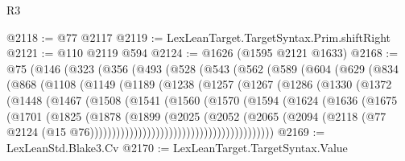 \begin{lexlean}{R3}
\begin{coremodule}
@2118 := @77 @2117
@2119 := LexLeanTarget.TargetSyntax.Prim.shiftRight
@2121 := @110 @2119 @594
@2124 := @1626 (@1595 @2121 @1633)
@2168 := @75
    (@146
      (@323
        (@356
          (@493
            (@528
              (@543
                (@562
                  (@589
                    (@604
                      (@629
                        (@834
                          (@868
                            (@1108
                              (@1149
                                (@1189
                                  (@1238
                                    (@1257
                                      (@1267
                                        (@1286
                                          (@1330
                                            (@1372
                                              (@1448
                                                (@1467
                                                  (@1508
                                                    (@1541
                                                      (@1560
                                                        (@1570
                                                          (@1594
                                                            (@1624
                                                              (@1636
                                                                (@1675
                                                                  (@1701
                                                                    (@1825
                                                                      (@1878
                                                                        (@1899
                                                                          (@2025
                                                                            (@2052
                                                                              (@2065
                                                                                (@2094
                                                                                  (@2118
                                                                                    (@77
                                                                                      @2124
                                                                                      (@15
                                                                                        @76))))))))))))))))))))))))))))))))))))))))))
@2169 := LexLeanStd.Blake3.Cv
@2170 := LexLeanTarget.TargetSyntax.Value

\end{coremodule}
\end{lexlean}
